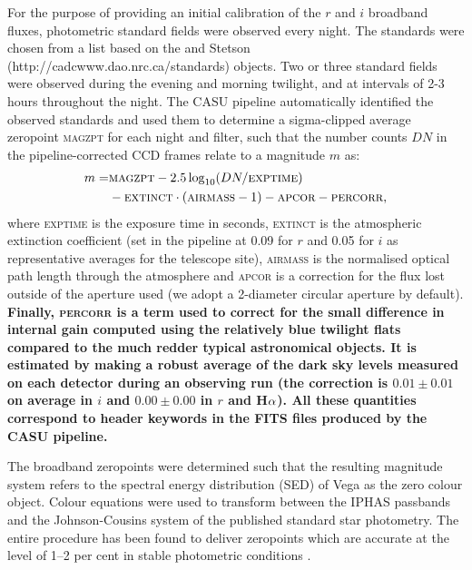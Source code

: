 \documentclass[a4paper,useAMS,usenatbib]{mn2e}
\def\ha{\mbox{H$\rm \alpha$}}
\begin{document}
For the purpose of providing an initial calibration 
of the $r$ and $i$ broadband fluxes,
photometric standard fields were observed every night.
The standards were chosen from a list based on 
the \cite{Landolt1992} and Stetson (http://cadcwww.dao.nrc.ca/standards) 
objects.
Two or three standard fields were observed 
during the evening and morning twilight,
and at intervals of 2-3 hours throughout the night.
The CASU pipeline automatically identified the observed standards 
and used them to determine a sigma-clipped average zeropoint \textsc{magzpt}
for each night and filter,
such that the number counts $DN$ 
in the pipeline-corrected CCD frames
relate to a magnitude $m$ as:
\begin{equation}
\begin{split}
   m  = & \textsc{magzpt} - 2.5 \log_{10}( DN / \textsc{exptime} ) \\
 &  - \textsc{extinct}\cdot(\textsc{airmass}-1) - \textsc{apcor} - \textsc{percorr},
\label{eqn:mag}
\end{split}
\end{equation}
where \textsc{exptime} is the exposure time in seconds,
\textsc{extinct} is the atmospheric extinction coefficient 
(set in the pipeline at 0.09 for $r$ and 0.05 for $i$ as representative
averages for the telescope site),
\textsc{airmass} is the normalised optical path length 
through the atmosphere and
\textsc{apcor} is a correction for the flux
lost outside of the aperture used
(we adopt a 2-diameter circular aperture by default).
{\bf
Finally, \textsc{percorr} is a term used to correct 
for the small difference in internal gain
computed using the relatively blue twilight flats
compared to the much redder typical astronomical objects. 
It is estimated by making a robust average of the dark sky levels 
measured on each detector during an observing run
(the correction is $0.01\pm0.01$ on average in $i$ and
$0.00\pm0.00$ in $r$ and \ha).
All these quantities correspond to header keywords
in the FITS files produced by the CASU pipeline. }

The broadband zeropoints were determined such that the resulting magnitude system
refers to the spectral energy distribution (SED) of Vega 
as the zero colour object. 
Colour equations were used to transform between the IPHAS passbands 
and the Johnson-Cousins system 
of the published standard star photometry.
The entire procedure has been found to deliver zeropoints which 
are accurate at the level of 1--2 per cent 
in stable photometric conditions \citep{Gonzalez-Solares2011}.
\end{document}
